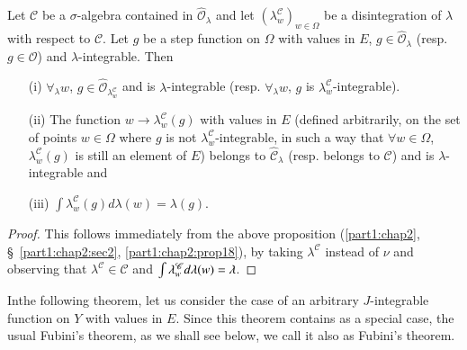 \begin{corollary}\label{part1:chap2:coro19}
Let $\mathscr{C}$ be a $\sigma$-algebra contained in
$\hat{\mathscr{O}}_\lambda$ and let $(\lambda^\mathscr{C}_w)_{w \in
  \Omega}$ be a disintegration of $\lambda$ with respect to
$\mathscr{C}$. Let $g$ be a step function on $\Omega$ with values in
$E$, $g \in \hat{\mathscr{O}}_\lambda$ (resp. $g \in \mathscr{O}$) and
$\lambda$-integrable. Then 
\begin{itemize}
\item[{\rm (i)}] $\forall_\lambda w$, $g
  \in\hat{\mathscr{O}}_{\lambda^\mathscr{C}_w}$ and is
  $\lambda$-integrable (resp. $\forall_\lambda w$, $g$ is
  $\lambda^\mathscr{C}_w$-integrable). 

\item[{\rm (ii)}] The function $w \to \lambda^\mathscr{C}_w (g)$ with
  values in $E$ (defined arbitrarily, on the set of points $w \in
  \Omega$ where $g$ is not $\lambda^\mathscr{C}_w$-integrable, in such
  a way that $\forall w \in \Omega$, $\lambda^\mathscr{C}_w (g)$ is
  still an element of $E$) belongs to $\hat{\mathscr{C}}_\lambda$
  (resp. belongs to $\mathscr{C}$) and is $\lambda$-integrable and 

\item[{\rm (iii)}] \qquad $\int \lambda^\mathscr{C}_w (g) d \lambda(w)
  = \lambda (g)$. 
\end{itemize}
\end{corollary}

\begin{proof}
This follows immediately from the above proposition
(\ref{part1:chap2}, \S\ \ref{part1:chap2:sec2},
\ref{part1:chap2:prop18}), 
by taking $\lambda^\mathscr{C}$ instead of $\nu$ and observing that
$\lambda^\mathscr{C} \in \mathscr{C}$ and $\int\lambda^\mathscr{C}_w\break d
\lambda (w) = \lambda$. 
\end{proof}

In\pageoriginale the following theorem, let us consider the case of an
arbitrary $J$-integrable function on $Y$ with values in $E$. Since
this theorem contains as a special case, the usual Fubini's theorem,
as we shall see below, we call it also as Fubini's theorem. 

